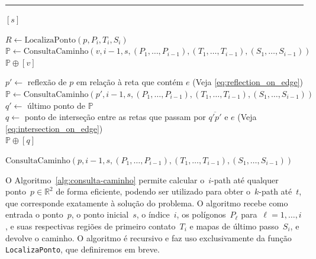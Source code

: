 \documentclass[11pt]{article}
\newcounter{algorithm}
\newcommand{\alglabel}[1]{%
	\refstepcounter{algorithm}%
	\label{#1}%
}
\newcommand{\algref}[1]{\ref{#1}}
\begin{document}
\begin{algorithm}[!ht]
\alglabel{alg:consulta-caminho}
\caption{Consulta Caminho}
\vspace{0.3em}
\hrule
\vspace{0.3em}
 
 {

	 {
		\Return {} \([s]\)
	}
	
	\(R \leftarrow \text{LocalizaPonto}(p, P_i, T_i, S_i)\) \\
	
	 {
		\(\mathbb{P} \leftarrow \text{ConsultaCaminho}(v, i - 1, s, (P_1, \dots, P_{i - 1}), (T_1, \dots, T_{i - 1}), (S_1, \dots, S_{i - 1}))\) \\
		\Return {} \(\mathbb{P} \oplus [v]\) 
	}
	
	 {
		\(p' \leftarrow\) reflexão de \(p\) em relação à reta que contém \(e\) (Veja \ref{eq:reflection_on_edge}) \\
		\(\mathbb{P} \leftarrow \text{ConsultaCaminho}(p', i - 1, s, (P_1, \dots, P_{i - 1}), (T_1, \dots, T_{i - 1}), (S_1, \dots, S_{i - 1}))\) \\
		\(q' \leftarrow\) último ponto de \(\mathbb{P}\) \\
		\(q \leftarrow\) ponto de interseção entre as retas que passam por \(\overline{q' p'}\) e \(e\) (Veja \ref{eq:intersection_on_edge}) \\
		\Return {} \(\mathbb{P} \oplus [q]\) 
	}
	
	 {
		\Return {} \(\text{ConsultaCaminho}(p, i - 1, s, (P_1, \dots, P_{i - 1}), (T_1, \dots, T_{i - 1}), (S_1, \dots, S_{i - 1}))\)
	}
}

\end{algorithm}

O Algoritmo~\algref{alg:consulta-caminho} permite calcular o~\(i\)-path até qualquer ponto~\(p \in \mathbb{R}^2\) de forma eficiente, podendo ser utilizado para obter o~\(k\)-path até~\(t\), que corresponde exatamente à solução do problema. O algoritmo recebe como entrada o ponto~\(p\), o ponto inicial~\(s\), o índice~\(i\), os polígonos~\(P_{\ell}\) para~\(\ell=1,\dots,i\), e suas respectivas regiões de primeiro contato~\(T_i\) e mapas de último passo~\(S_i\), e devolve o caminho. O algoritmo é recursivo e faz uso exclusivamente da função \texttt{LocalizaPonto}, que definiremos em breve.
\end{document}
